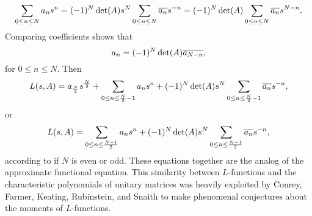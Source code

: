    \[
      \sum_{0 \le n \le N}a_{n}s^{n} = (-1)^{N}\det(A)s^{N}\sum_{0 \le n \le N}\overline{a_{n}}s^{-n} = (-1)^{N}\det(A)\sum_{0 \le n \le N}\overline{a_{n}}s^{N-n}.
    \]
    Comparing coefficients shows that
    \[
      a_{n} = (-1)^{N}\det(A)\overline{a_{N-n}},
    \]
    for $0 \le n \le N$. Then
    \[
      L(s,A) = a_{\frac{N}{2}}s^{\frac{N}{2}}+\sum_{0 \le n \le \frac{N}{2}-1}a_{n}s^{n}+(-1)^{N}\det(A)s^{N}\sum_{0 \le n \le \frac{N}{2}-1}\overline{a_{n}}s^{-n},
    \]
    or
    \[
      L(s,A) = \sum_{0 \le n \le \frac{N-1}{2}}a_{n}s^{n}+(-1)^{N}\det(A)s^{N}\sum_{0 \le n \le \frac{N-1}{2}}\overline{a_{n}}s^{-n},
    \]
    according to if $N$ is even or odd. These equations together are the analog of the approximate functional equation. This similarity between $L$-functions and the characteristic polynomials of unitary matrices was heavily exploited by Conrey, Farmer, Keating, Rubinstein, and Snaith to make phenomenal conjectures about the  moments of $L$-functions.